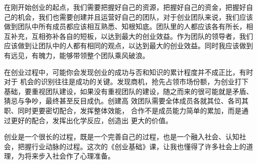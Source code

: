 \documentclass[UTF8]{article}
\begin{document}
在刚开始创业的起点，我们需要把握好自己的资源，把握好自己的资金，把握好自己的机会，我们也需要创建并且运营好自己的团队，对于创业团队来说，我们应该做到团队中所有成员都应该相互熟悉、知根知底。团队里的人都应该各有所长，相互补充，互相弥补各自的短板，以达到最大的创业效益。作为团队的领导者，我们应该做到让团队中的人都有相同的观点，以达到最大的创业效益。同时我应该做到有远见，有魄力，能够带领整个团队乘风破浪。

在创业过程中，可能你会发现创业的成功与否和知识的累计程度并不成正比，有时对于
机会的识别往往是成功的关键。发现商机，抢先占领市场份额，为创业打下基础，要重视团队建设，如果没有重视团队的建设，随之而来的很可能就是矛盾、猜忌与争吵，最终甚至反目成仇。创建高
效团队需要全体成员各就其位、各司其职、同时更要密切配合，发挥整体效能，
合作不是成员能力简单的累加，而是通过更好的配合，发挥出化学反应，创造出
更大的价值。  

创业是一个很长的过程，既是一个完善自己的过程，也是一个融入社会、认知社会，把握行业动脉的过程。这次的《创业基础》课，让我也懂得了许多社会上的道理，为将来步入社会作了心理准备。
\end{document}
